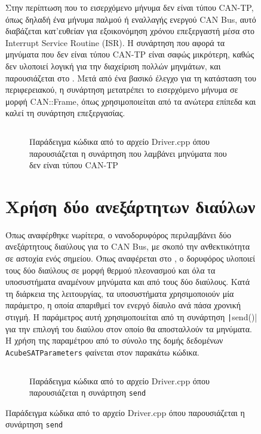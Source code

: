 \documentclass[a4paper,nobib,justified]{tufte-book}
\begin{document}
\begin{figure}
Στην περίπτωση που το εισερχόμενο μήνυμα δεν είναι τύπου CAN-TP, όπως δηλαδή ένα μήνυμα παλμού ή εναλλαγής ενεργού CAN Bus, αυτό διαβάζεται κατ'ευθείαν για εξοικονόμηση χρόνου επεξεργαστή μέσα στο Interrupt Service Routine (ISR). Η συνάρτηση που αφορά τα μηνύματα που δεν είναι τύπου CAN-TP είναι σαφώς μικρότερη, καθώς δεν υλοποιεί λογική για την διαχείριση πολλών μηνμάτων, και παρουσιάζεται στο . Μετά από ένα βασικό έλεγχο για τη κατάσταση του περιφερειακού, η συνάρτηση μετατρέπει το εισερχόμενο μήνυμα σε μορφή CAN::Frame, όπως χρησιμοποιείται από τα ανώτερα επίπεδα και καλεί τη συνάρτηση επεξεργασίας.

\begin{figure}
	\inputminted{c++}{code/examples/driver-non-tp-receiver.cpp}
	\label{code:driver-non-tp-receiver}
	\caption[Η συνάρτηση που λαμβάνει μηνύματα που δεν είναι τύπου CAN-TP]{Παράδειγμα κώδικα από το αρχείο Driver.cpp όπου παρουσιάζεται η συνάρτηση που λαμβάνει μηνύματα που δεν είναι τύπου CAN-TP}
\end{figure}
\FloatBarrier

\section{Χρήση δύο ανεξάρτητων διαύλων}

Όπως αναφέρθηκε νωρίτερα, ο νανοδορυφόρος περιλαμβάνει δύο ανεξάρτητους διαύλους για το CAN Bus, με σκοπό την ανθεκτικότητα σε αστοχία ενός σημείου. Όπως αναφέρεται στο , ο δορυφόρος υλοποιεί τους δύο διαύλους σε μορφή θερμού πλεονασμού και όλα τα υποσυστήματα αναμένουν μηνύματα και από τους δύο διαύλους. Κατά τη διάρκεια της λειτουργίας, τα υποσυστήματα χρησιμοποιούν μία παράμετρο, η οποία απαριθμεί τον ενεργό δίαυλο ανά πάσα χρονική στιγμή.  Η παράμετρος αυτή χρησιμοποιείται από τη συνάρτηση \texttt|send()| για την επιλογή του διαύλου στον οποίο θα αποσταλλούν τα μηνύματα. Η χρήση της παραμέτρου από το σύνολο της δομής δεδομένων \texttt{AcubeSATParameters} φαίνεται στον παρακάτω κώδικα.

\begin{figure}
	\inputminted{c++}{code/examples/driver-send.cpp}
	\label{code:driver-send}
	\caption{Παράδειγμα κώδικα από το αρχείο Driver.cpp όπου παρουσιάζεται η συνάρτηση \texttt{send}}
\end{figure}


\end{figure}
\end{document}
